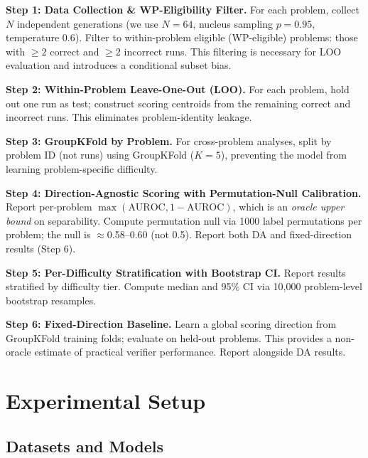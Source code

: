 \documentclass{article}
\begin{document}
\textbf{Step 1: Data Collection \& WP-Eligibility Filter.} For each problem, collect $N$ independent generations (we use $N{=}64$, nucleus sampling $p{=}0.95$, temperature 0.6). Filter to within-problem eligible (WP-eligible) problems: those with $\geq 2$ correct and $\geq 2$ incorrect runs. This filtering is necessary for LOO evaluation and introduces a conditional subset bias.

\textbf{Step 2: Within-Problem Leave-One-Out (LOO).} For each problem, hold out one run as test; construct scoring centroids from the remaining correct and incorrect runs. This eliminates problem-identity leakage.

\textbf{Step 3: GroupKFold by Problem.} For cross-problem analyses, split by problem ID (not runs) using GroupKFold ($K{=}5$), preventing the model from learning problem-specific difficulty.

\textbf{Step 4: Direction-Agnostic Scoring with Permutation-Null Calibration.} Report per-problem $\max(\text{AUROC}, 1{-}\text{AUROC})$, which is an \textit{oracle upper bound} on separability. Compute permutation null via 1000 label permutations per problem; the null is $\approx$0.58--0.60 (not 0.5). Report both DA and fixed-direction results (Step 6).

\textbf{Step 5: Per-Difficulty Stratification with Bootstrap CI.} Report results stratified by difficulty tier. Compute median and 95\% CI via 10,000 problem-level bootstrap resamples.

\textbf{Step 6: Fixed-Direction Baseline.} Learn a global scoring direction from GroupKFold training folds; evaluate on held-out problems. This provides a non-oracle estimate of practical verifier performance. Report alongside DA results.

\section{Experimental Setup}
\label{sec:setup}

\subsection{Datasets and Models}

\begin{table}[t]
\centering
\caption{Datasets and models. WP-elig.\ = within-problem eligible ($\geq 2$ correct, $\geq 2$ wrong).}
\label{tab:datasets}
\end{table}
\end{document}
